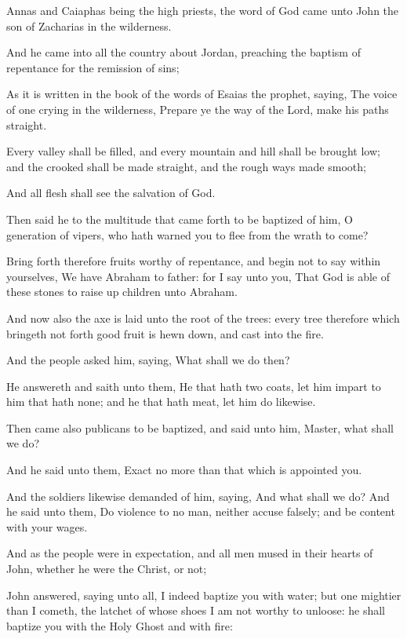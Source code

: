 {Annas
and
Caiaphas
being the high
priests, the
word of
God
came
unto
John the
son of
Zacharias
in the
wilderness.

And he
came
into
all the country
about
Jordan,
preaching the
baptism of
repentance
for the
remission of
sins;

As it is
written
in the
book of the
words of
Esaias the
prophet,
saying, The
voice of one
crying
in the
wilderness, Prepare
ye the
way of the
Lord,
make
his
paths
straight.

Every
valley shall be
filled,
and
every
mountain
and
hill shall be brought
low;
and the
crooked shall be
made
straight,
and the
rough
ways
{}
made
smooth;

And
all
flesh shall
see the
salvation of
God.

Then said
he to the
multitude that came
forth to be
baptized
of
him, O
generation of
vipers,
who hath
warned
you to
flee
from the
wrath to
come?

Bring
forth
therefore
fruits
worthy of
repentance,
and
begin
not to
say
within
yourselves, We
have
Abraham
to
{}
father:
for I
say unto
you,
That
God is
able
of
these
stones to raise
up
children unto
Abraham.

And
now
also the
axe is
laid
unto the
root of the
trees:
every
tree
therefore which
bringeth
not
forth
good
fruit is hewn
down,
and
cast
into the
fire.

And the
people
asked
him,
saying,
What shall we
do
then?

He
answereth
and
saith unto
them, He that
hath
two
coats, let him
impart to him that
hath
none;
and he that
hath
meat, let him
do
likewise.

Then
came
also
publicans to be
baptized,
and
said
unto
him,
Master,
what shall we
do?

And he
said
unto
them,
Exact
no
more
than that which is
appointed
you.

And the
soldiers
likewise
demanded of
him,
saying,
And
what
shall
we
do?
And he
said
unto
them, Do violence
to no
man,
neither
accuse
{}
falsely;
and be
content
with
your
wages.

And as the
people were in
expectation,
and all
men
mused
in
their
hearts
of
John,
whether
he
were the
Christ, or
not;

John
answered,
saying
unto
{}
all,
I
indeed
baptize
you with
water;
but one mightier
than
I
cometh, the
latchet of
whose
shoes I
am
not
worthy to
unloose:
he shall
baptize
you
with
the
Holy
Ghost
and with
fire:

}
